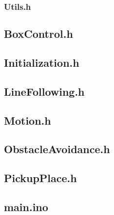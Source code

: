\documentclass{article}
\begin{document}
\subsubsection{Utils.h}


\subsection{BoxControl.h}


\subsection{Initialization.h}


\subsection{LineFollowing.h}


\subsection{Motion.h}


\subsection{ObstacleAvoidance.h}


\subsection{PickupPlace.h}


\subsection{main.ino}

\end{document}
